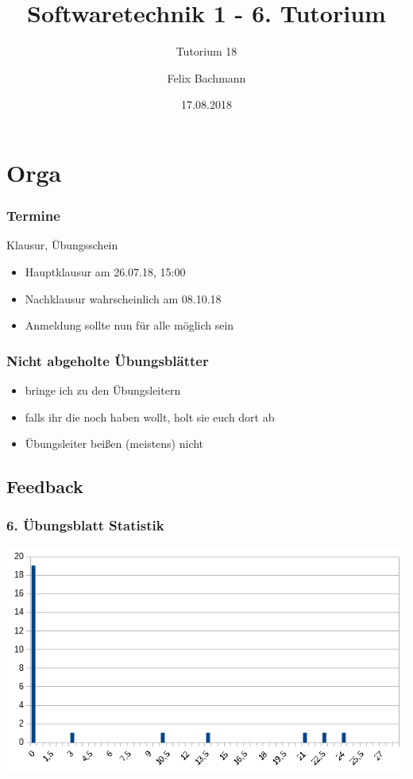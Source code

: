 \documentclass[18pt]{beamer}
\title[SWT1]{Softwaretechnik 1 - 6. Tutorium}
\subtitle{Tutorium 18}
\author{Felix Bachmann}
\date{17.08.2018}
\institute{KIT - Institut für Programmstrukturen und Datenorganisation (IPD)}
\begin{document}
	
\setcounter{tocdepth}{2}
	
\begin{frame}
\titlepage
\end{frame}

\begin{frame}
\tableofcontents
\end{frame}


\section{Orga}
	\begin{frame}
		\frametitle{Termine}
		\begin{block}{Klausur, Übungsschein}
			\begin{itemize}
				\item Hauptklausur am 26.07.18, 15:00
				\item Nachklausur wahrscheinlich am 08.10.18
				\item Anmeldung sollte nun für alle möglich sein
			\end{itemize}
		\end{block}
	\end{frame}

	\begin{frame}
		\frametitle{Nicht abgeholte Übungsblätter}
		\begin{itemize}
			\item bringe ich zu den Übungsleitern
			\item falls ihr die noch haben wollt, holt sie euch dort ab
			\item Übungsleiter beißen (meistens) nicht
		\end{itemize}
	\end{frame}

	\subsection{Feedback}
	\begin{frame}
		\frametitle{6. Übungsblatt Statistik}
		\includegraphics[scale=0.7]{./pics/tut6/statistics-ub6.png}
	\end{frame}
\end{document}
